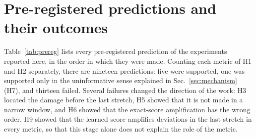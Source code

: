 \section{Pre-registered predictions and their outcomes}
\label{sec:prereg}

Table~\ref{tab:prereg} lists every pre-registered prediction of the experiments reported here, in the order in which they were made.
Counting each metric of H1 and H2 separately, there are nineteen predictions: five were supported, one was supported only in the uninformative sense explained in Sec.~\ref{sec:mechanism} (H7), and thirteen failed.
Several failures changed the direction of the work: H3 located the damage before the last stretch, H5 showed that it is not made in a narrow window, and H6 showed that the exact-score amplification has the wrong order.
H9 showed that the learned score amplifies deviations in the last stretch in every metric, so that this stage alone does not explain the role of the metric.


